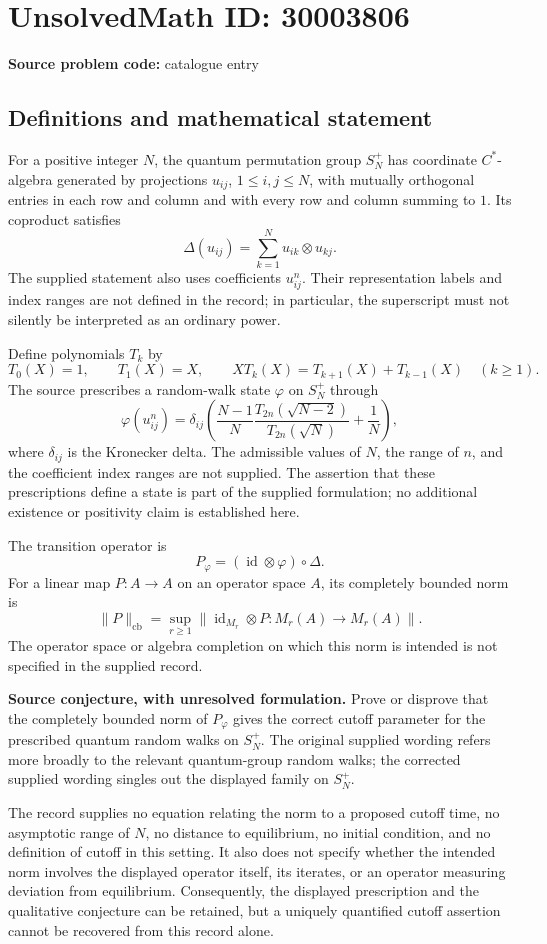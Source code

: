 \documentclass[11pt]{article}
\begin{document}
\section*{UnsolvedMath ID: 30003806}
\textbf{Source problem code:} catalogue entry
\subsection{Definitions and mathematical statement}
For a positive integer \(N\), the quantum permutation group \(S_N^+\) has coordinate \(C^*\)-algebra generated by projections \(u_{ij}\), \(1\leq i,j\leq N\), with mutually orthogonal entries in each row and column and with every row and column summing to \(1\). Its coproduct satisfies
\[
\Delta(u_{ij})=\sum_{k=1}^N u_{ik}\otimes u_{kj}.
\]
The supplied statement also uses coefficients \(u_{ij}^{n}\). Their representation labels and index ranges are not defined in the record; in particular, the superscript must not silently be interpreted as an ordinary power.

Define polynomials \(T_k\) by
\[
T_0(X)=1,\qquad T_1(X)=X,\qquad
XT_k(X)=T_{k+1}(X)+T_{k-1}(X)\quad(k\geq1).
\]
The source prescribes a random-walk state \(\varphi\) on \(S_N^+\) through
\[
\varphi(u_{ij}^{n})=\delta_{ij}\left(
\frac{N-1}{N}\frac{T_{2n}(\sqrt{N-2})}{T_{2n}(\sqrt N)}+\frac1N
\right),
\]
where \(\delta_{ij}\) is the Kronecker delta. The admissible values of \(N\), the range of \(n\), and the coefficient index ranges are not supplied. The assertion that these prescriptions define a state is part of the supplied formulation; no additional existence or positivity claim is established here.

The transition operator is
\[
P_\varphi=(\operatorname{id}\otimes\varphi)\circ\Delta.
\]
For a linear map \(P:A\to A\) on an operator space \(A\), its completely bounded norm is
\[
\|P\|_{\mathrm{cb}}
=\sup_{r\geq1}\bigl\|\operatorname{id}_{M_r}\otimes P:
M_r(A)\longrightarrow M_r(A)\bigr\|.
\]
The operator space or algebra completion on which this norm is intended is not specified in the supplied record.

\textbf{Source conjecture, with unresolved formulation.} Prove or disprove that the completely bounded norm of \(P_\varphi\) gives the correct cutoff parameter for the prescribed quantum random walks on \(S_N^+\). The original supplied wording refers more broadly to the relevant quantum-group random walks; the corrected supplied wording singles out the displayed family on \(S_N^+\).

The record supplies no equation relating the norm to a proposed cutoff time, no asymptotic range of \(N\), no distance to equilibrium, no initial condition, and no definition of cutoff in this setting. It also does not specify whether the intended norm involves the displayed operator itself, its iterates, or an operator measuring deviation from equilibrium. Consequently, the displayed prescription and the qualitative conjecture can be retained, but a uniquely quantified cutoff assertion cannot be recovered from this record alone.
\end{document}
